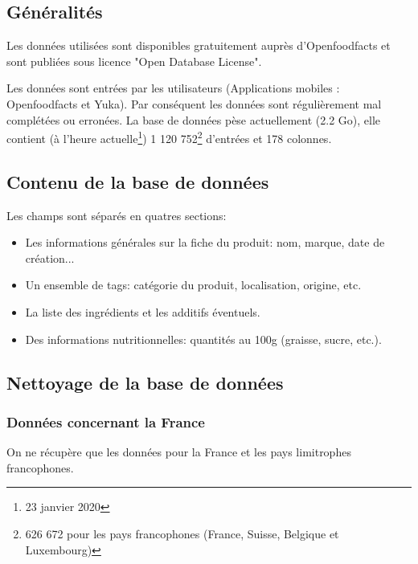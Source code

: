   \subsection{Généralités}

  Les données utilisées sont disponibles gratuitement auprès d'Openfoodfacts et
  sont publiées sous licence "Open Database License".

  Les données sont entrées par les utilisateurs (Applications mobiles :
  Openfoodfacts et Yuka). Par conséquent les données sont régulièrement mal
  complétées ou erronées.
  La base de données pèse actuellement (2.2 Go), elle contient (à l'heure
  actuelle\footnote{23 janvier 2020}) 1 120 752\footnote{626 672 pour les pays
  francophones (France, Suisse, Belgique et Luxembourg)} d'entrées et 178 colonnes.

  \subsection{Contenu de la base de données}

  Les champs sont séparés en quatres sections:
  \begin{itemize}
    \item Les informations générales sur la fiche du produit: nom, marque, date de création...
    \item Un ensemble de tags: catégorie du produit, localisation, origine, etc.
    \item La liste des ingrédients et les additifs éventuels.
    \item Des informations nutritionnelles: quantités au 100g (graisse, sucre, etc.).
  \end{itemize}

  \subsection{Nettoyage de la base de données}

    \subsubsection{Données concernant la France}
    On ne récupère que les données pour la France et les pays limitrophes
    francophones.

